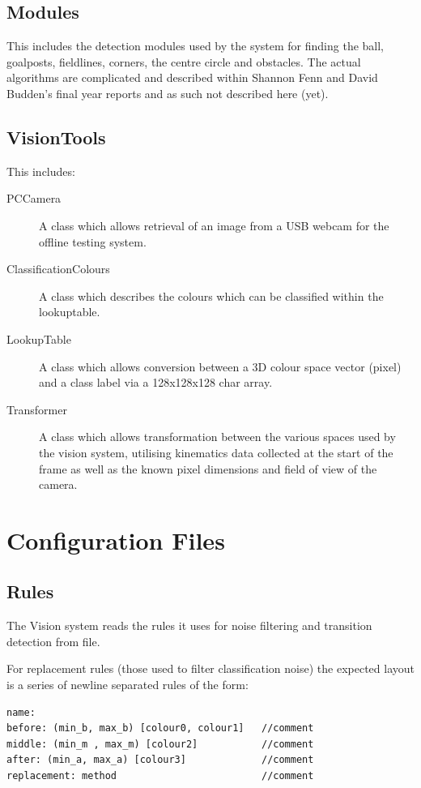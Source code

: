 \documentclass[]{report}
\begin{document}
\section{Modules}
This includes the detection modules used by the system for finding the ball, goalposts, fieldlines, corners, the centre circle and obstacles. The actual algorithms are complicated and described within Shannon Fenn and David Budden's final year reports and as such not described here (yet).

\section{VisionTools}
This includes:
\begin{description}
\item[PCCamera] A class which allows retrieval of an image from a USB webcam for the offline testing system.
\item[ClassificationColours] A class which describes the colours which can be classified within the lookuptable.
\item[LookupTable] A class which allows conversion between a 3D colour space vector (pixel) and a class label via a 128x128x128 char array.
\item[Transformer] A class which allows transformation between the various spaces used by the vision system, utilising kinematics data collected at the start of the frame as well as the known pixel dimensions and field of view of the camera.
\end{description}

\chapter{Configuration Files}

\section{Rules}
The Vision system reads the rules it uses for noise filtering and transition detection from file. 

For replacement rules (those used to filter classification noise) the expected layout is a series of newline separated rules of the form:
\begin{verbatim}
name:
before: (min_b, max_b) [colour0, colour1]   //comment
middle: (min_m , max_m) [colour2]           //comment
after: (min_a, max_a) [colour3]             //comment
replacement: method                         //comment
\end{verbatim}
\end{document}
